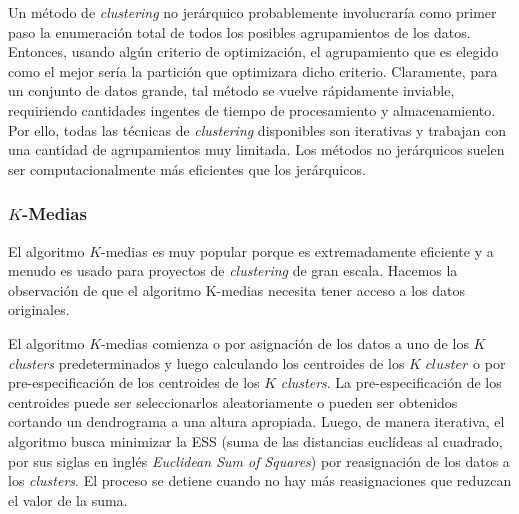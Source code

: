 \documentclass[a4paper, 20pt]{article}
\begin{document}
Un método de \textit{clustering} no jerárquico probablemente involucraría como primer paso la enumeración total de todos los posibles agrupamientos de los datos. Entonces, usando algún criterio de optimización, el agrupamiento que es elegido como el mejor sería la partición que optimizara dicho criterio. Claramente, para un conjunto de datos grande, tal método se vuelve rápidamente inviable, requiriendo cantidades ingentes de tiempo de procesamiento y almacenamiento. Por ello, todas las técnicas de \textit{clustering} disponibles son iterativas y trabajan con una cantidad de agrupamientos muy limitada. Los métodos no jerárquicos suelen ser computacionalmente más eficientes que los jerárquicos.

\subsubsection{$K$-Medias}

El algoritmo $K$-medias es muy popular porque es extremadamente eficiente y a menudo es usado para proyectos de \textit{clustering} de gran escala. Hacemos la observación de que el algoritmo K-medias necesita tener acceso a los datos originales.

El algoritmo $K$-medias comienza o por asignación de los datos a uno de los $K$ \textit{clusters} predeterminados y luego calculando los centroides de los $K$ \textit{$cluster$} o por pre-especificación de los centroides de los $K$ \textit{clusters}. La pre-especificación de los centroides puede ser seleccionarlos aleatoriamente o pueden ser obtenidos cortando un dendrograma a una altura apropiada. Luego, de manera iterativa, el algoritmo busca minimizar la ESS (suma de las distancias euclídeas al cuadrado, por sus siglas en inglés \textit{Euclidean Sum of Squares}) por reasignación de los datos a los \textit{clusters}. El proceso se detiene cuando no hay más reasignaciones  que reduzcan el valor de la suma.
\end{document}
